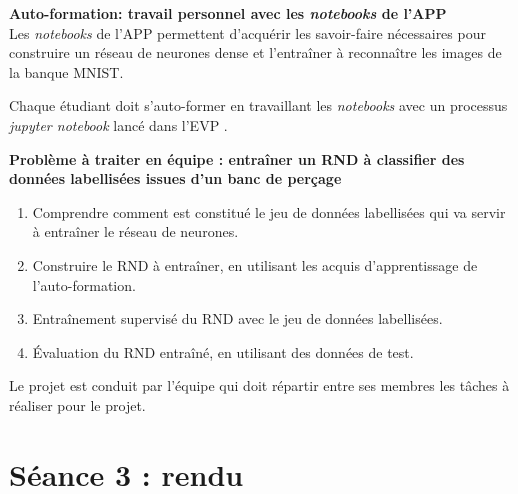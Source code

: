 \documentclass[11pt,french]{article}
\begin{document}
\begin {bclogo}[noborder=true, couleurBarre=Chocolate, logo=\bctrombone]{}
  \vspace*{-4mm}\textbf{Auto-formation: travail personnel avec les {\em notebooks} de l'APP}\\[-2mm]

  Les {\em notebooks} de l'APP permettent d'acquérir les savoir-faire nécessaires pour construire un réseau de neurones dense
  et l'entraîner à reconnaître les images de la banque MNIST.

Chaque étudiant doit s'auto-former en travaillant les {\em notebooks} avec un processus {\em jupyter notebook} lancé dans l'EVP .
\end{bclogo}  

\begin {bclogo}[noborder=true, couleurBarre=Chocolate, logo=\bctrombone]{}
  \vspace*{-4mm}\textbf{Problème à traiter en équipe : entraîner un RND à classifier des données labellisées issues d'un banc de perçage}\\[-2mm]

\begin{enumerate}
\item Comprendre comment est constitué le jeu de données labellisées qui va servir à entraîner le réseau de neurones.
\item Construire le RND à entraîner, en utilisant les acquis d'apprentissage de l'auto-formation.
\item Entraînement supervisé du RND avec le jeu de données labellisées.
\item Évaluation du RND entraîné, en utilisant des données de test.
\end{enumerate}

Le projet est conduit par l'équipe qui doit répartir entre ses membres les tâches à réaliser pour le projet.
\end{bclogo}  

\newpage
\vspace*{-16mm}
\section*{ Séance 3 : rendu}
\end{document}
